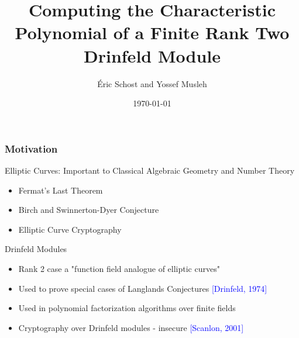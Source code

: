 \documentclass{beamer}
\title[]{Computing the Characteristic Polynomial of a Finite Rank Two Drinfeld Module} %
\author{\'Eric Schost and Yossef Musleh} %
\institute[UW] %
{
University of Waterloo \\ %
\medskip
\textit{ISSAC 2019 \\ Beihang University \\ Beijing, People's Republic of China} %
}
\date{\today} %
\newcommand{\blue}{\textcolor{blue}}
\begin{document}
\begin{frame}
\titlepage %
\end{frame}



\begin{frame}
\frametitle{Motivation}



  Elliptic Curves: Important to Classical Algebraic Geometry and Number Theory
\begin{itemize}
 \item     Fermat's Last Theorem
\item Birch and Swinnerton-Dyer Conjecture
 \item Elliptic Curve Cryptography
 \end{itemize}
    

 Drinfeld Modules

\begin{itemize}

\item Rank 2 case a "function field analogue of elliptic curves"
  \item Used to prove special cases of Langlands Conjectures \textcolor{blue}{[Drinfeld, 1974]}
   \item  Used in polynomial factorization algorithms over finite fields
    
 
     \item Cryptography over Drinfeld modules - insecure \blue{[Scanlon, 2001]}
     \end{itemize}
  
  
  

\end{frame}
\end{document}
